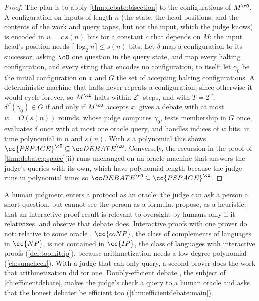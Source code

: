 \begin{refsection}
\begin{proof}
The plan is to apply \cref{thm:debate:bisection} to the configurations of $M^{\cO}$. A configuration on inputs of length $n$ (the state, the head positions, and the contents of the work and query tapes, but not the input, which the judge knows) is encoded in $w=c\,s(n)$ bits for a constant $c$ that depends on $M$; the input head's position needs $\lceil\log_2n\rceil\le s(n)$ bits. Let $\delta$ map a configuration to its successor, asking $\cO$ one question in the query state, and map every halting configuration, and every string that encodes no configuration, to itself; let $\gamma_0$ be the initial configuration on $x$ and $G$ the set of accepting halting configurations. A deterministic machine that halts never repeats a configuration, since otherwise it would cycle forever, so $M^{\cO}$ halts within $2^w$ steps, and with $T=2^w$, $\delta^T(\gamma_0)\in G$ if and only if $M^{\cO}$ accepts $x$.  gives a debate with at most $w=O(s(n))$ rounds, whose judge computes $\gamma_0$, tests membership in $G$ once, evaluates $\delta$ once with at most one oracle query, and handles indices of $w$ bits, in time polynomial in $n$ and $s(n)$. With $s$ a polynomial this shows $\cc{PSPACE}^{\cO}\subseteq\debateclass^{\cO}$. Conversely, the recursion in the proof of \cref{thm:debate:pspace}(ii) runs unchanged on an oracle machine that answers the judge's queries with its own, which have polynomial length because the judge runs in polynomial time; so $\debateclass^{\cO}\subseteq\cc{PSPACE}^{\cO}$.
\end{proof}

A human judgment enters a protocol as an oracle: the judge can ask a person a short question, but cannot see the person as a formula. \Textcite{IrvingMarshall2025} propose, as a heuristic, that an interactive-proof result is relevant to oversight by humans only if it relativizes, and observe that debate does. Interactive proofs with one prover do not: relative to some oracle \parencite{FortnowSipser1988}, $\cc{coNP}$, the class of complements of languages in $\cc{NP}$, is not contained in $\cc{IP}$, the class of languages with interactive proofs (\cref{def:toolkit:ip}), because arithmetization needs a low-degree polynomial (\cref{ch:sumcheck}). With a judge that can only query, a second prover does the work that arithmetization did for one. Doubly-efficient debate \parencite{BrownCohenEtAl2024}, the subject of \cref{ch:efficientdebate}, makes the judge's check a query to a human oracle and asks that the honest debater be efficient too (\cref{thm:efficientdebate:main}).


\end{refsection}
